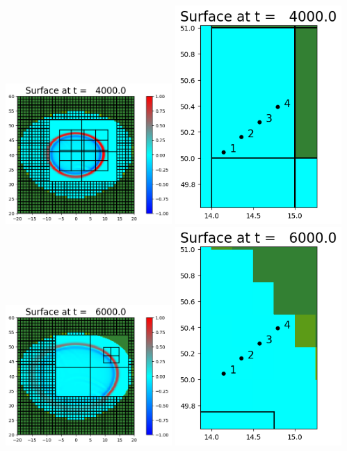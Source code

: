 \documentclass[11pt]{article}
\begin{document}
\vskip 10pt 
\includegraphics[width=0.475\textwidth]{frame0002fig0.png}
\includegraphics[width=0.475\textwidth]{frame0002fig7.png}
\vskip 10pt 
\includegraphics[width=0.475\textwidth]{frame0003fig0.png}
\includegraphics[width=0.475\textwidth]{frame0003fig7.png}
\end{document}
